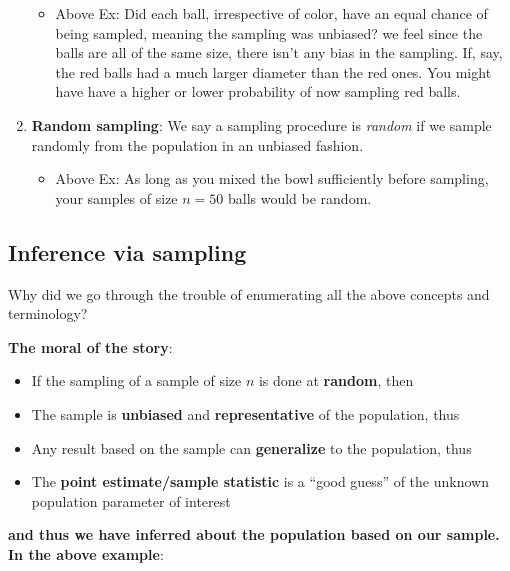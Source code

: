 \documentclass[12pt,]{krantz}
\providecommand{\tightlist}{%
  \setlength{\itemsep}{0pt}\setlength{\parskip}{0pt}}
\renewenvironment{quote}{\begin{VF}}{\end{VF}}
\theoremstyle{definition}
\theoremstyle{definition}
\theoremstyle{definition}
\theoremstyle{remark}
\begin{document}
\begin{enumerate}
  \begin{itemize}
  \tightlist
  \item
    Above Ex: Did each ball, irrespective of color, have an equal chance
    of being sampled, meaning the sampling was unbiased? we feel since
    the balls are all of the same size, there isn't any bias in the
    sampling. If, say, the red balls had a much larger diameter than the
    red ones. You might have have a higher or lower probability of now
    sampling red balls.
  \end{itemize}
\item
  \textbf{Random sampling}: We say a sampling procedure is \emph{random}
  if we sample randomly from the population in an unbiased fashion.

  \begin{itemize}
  \tightlist
  \item
    Above Ex: As long as you mixed the bowl sufficiently before
    sampling, your samples of size \(n=50\) balls would be random.
  \end{itemize}
\end{enumerate}

\subsection*{Inference via sampling}\label{inference-via-sampling}


Why did we go through the trouble of enumerating all the above concepts
and terminology?

\textbf{The moral of the story}:

\begin{quote}
\begin{itemize}
\tightlist
\item
  If the sampling of a sample of size \(n\) is done at \textbf{random},
  then
\item
  The sample is \textbf{unbiased} and \textbf{representative} of the
  population, thus
\item
  Any result based on the sample can \textbf{generalize} to the
  population, thus
\item
  The \textbf{point estimate/sample statistic} is a ``good guess'' of
  the unknown population parameter of interest
\end{itemize}
\end{quote}

\textbf{and thus we have inferred about the population based on our
sample. In the above example}:
\end{document}

